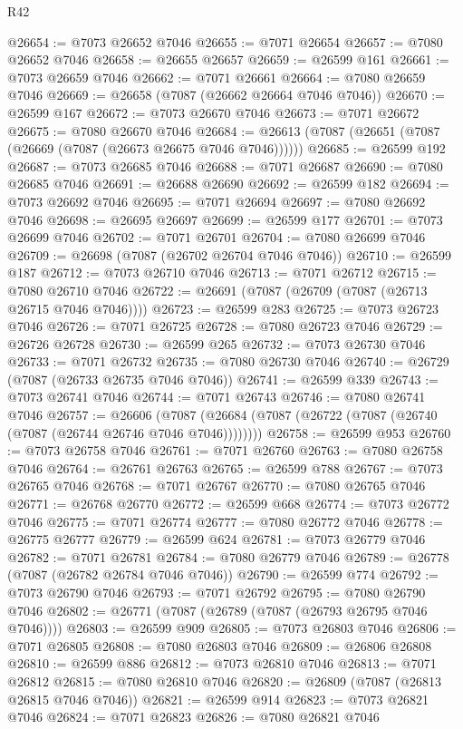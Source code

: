 \begin{lexlean}{R42}
\begin{coremodule}
{@26654 := @7073 @26652 @7046
@26655 := @7071 @26654
@26657 := @7080 @26652 @7046
@26658 := @26655 @26657
@26659 := @26599 @161
@26661 := @7073 @26659 @7046
@26662 := @7071 @26661
@26664 := @7080 @26659 @7046
@26669 := @26658 (@7087 (@26662 @26664 @7046 @7046))
@26670 := @26599 @167
@26672 := @7073 @26670 @7046
@26673 := @7071 @26672
@26675 := @7080 @26670 @7046
@26684 := @26613 (@7087 (@26651 (@7087 (@26669 (@7087 (@26673 @26675 @7046 @7046))))))
@26685 := @26599 @192
@26687 := @7073 @26685 @7046
@26688 := @7071 @26687
@26690 := @7080 @26685 @7046
@26691 := @26688 @26690
@26692 := @26599 @182
@26694 := @7073 @26692 @7046
@26695 := @7071 @26694
@26697 := @7080 @26692 @7046
@26698 := @26695 @26697
@26699 := @26599 @177
@26701 := @7073 @26699 @7046
@26702 := @7071 @26701
@26704 := @7080 @26699 @7046
@26709 := @26698 (@7087 (@26702 @26704 @7046 @7046))
@26710 := @26599 @187
@26712 := @7073 @26710 @7046
@26713 := @7071 @26712
@26715 := @7080 @26710 @7046
@26722 := @26691 (@7087 (@26709 (@7087 (@26713 @26715 @7046 @7046))))
@26723 := @26599 @283
@26725 := @7073 @26723 @7046
@26726 := @7071 @26725
@26728 := @7080 @26723 @7046
@26729 := @26726 @26728
@26730 := @26599 @265
@26732 := @7073 @26730 @7046
@26733 := @7071 @26732
@26735 := @7080 @26730 @7046
@26740 := @26729 (@7087 (@26733 @26735 @7046 @7046))
@26741 := @26599 @339
@26743 := @7073 @26741 @7046
@26744 := @7071 @26743
@26746 := @7080 @26741 @7046
@26757 := @26606
    (@7087 (@26684 (@7087 (@26722 (@7087 (@26740 (@7087 (@26744 @26746 @7046 @7046))))))))
@26758 := @26599 @953
@26760 := @7073 @26758 @7046
@26761 := @7071 @26760
@26763 := @7080 @26758 @7046
@26764 := @26761 @26763
@26765 := @26599 @788
@26767 := @7073 @26765 @7046
@26768 := @7071 @26767
@26770 := @7080 @26765 @7046
@26771 := @26768 @26770
@26772 := @26599 @668
@26774 := @7073 @26772 @7046
@26775 := @7071 @26774
@26777 := @7080 @26772 @7046
@26778 := @26775 @26777
@26779 := @26599 @624
@26781 := @7073 @26779 @7046
@26782 := @7071 @26781
@26784 := @7080 @26779 @7046
@26789 := @26778 (@7087 (@26782 @26784 @7046 @7046))
@26790 := @26599 @774
@26792 := @7073 @26790 @7046
@26793 := @7071 @26792
@26795 := @7080 @26790 @7046
@26802 := @26771 (@7087 (@26789 (@7087 (@26793 @26795 @7046 @7046))))
@26803 := @26599 @909
@26805 := @7073 @26803 @7046
@26806 := @7071 @26805
@26808 := @7080 @26803 @7046
@26809 := @26806 @26808
@26810 := @26599 @886
@26812 := @7073 @26810 @7046
@26813 := @7071 @26812
@26815 := @7080 @26810 @7046
@26820 := @26809 (@7087 (@26813 @26815 @7046 @7046))
@26821 := @26599 @914
@26823 := @7073 @26821 @7046
@26824 := @7071 @26823
@26826 := @7080 @26821 @7046
}
\end{coremodule}
\end{lexlean}

